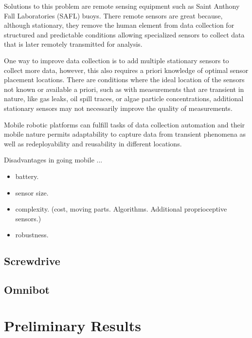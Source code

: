 	Solutions to this problem are remote sensing equipment such as Saint Anthony Fall Laboratories (SAFL) buoys. There remote sensors are great because, although stationary, they remove the human element from data collection for structured and predictable conditions allowing specialized sensors to collect data that is later remotely transmitted for analysis. 

	One way to improve data collection is to add multiple stationary sensors to collect more data, however, this also requires a priori knowledge of optimal sensor placement locations. There are conditions where the ideal location of the sensors not known or available a priori, such as with measurements that are transient in nature, like gas leaks, oil spill traces, or algae particle concentrations, additional stationary sensors may not necessarily improve the quality of measurements. 

	Mobile robotic platforms can fulfill tasks of data collection automation and their mobile nature permits adaptability to capture data from transient phenomena as well as redeployability and reusability in different locations. 

	Disadvantages in going mobile ... 
	\begin{itemize}
		\item battery.
		\item sensor size.
		\item complexity. (cost, moving parts. Algorithms. Additional proprioceptive sensors.)
		\item robustness. 
	\end{itemize}


	\subsection{Screwdrive}
	
	
	\subsection{Omnibot}
	\label{sec:omnibot}
	







\section{Preliminary Results}

